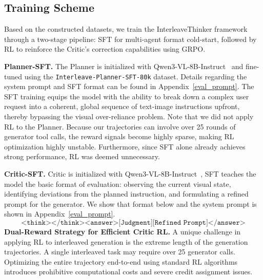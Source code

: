 \documentclass{article} %
\begin{document}
\subsection{Training Scheme}
\label{subsec:training}

Based on the constructed datasets, we train the InterleaveThinker framework through a two-stage pipeline: SFT for multi-agent format cold-start, followed by RL to reinforce the Critic's correction capabilities using GRPO.

\textbf{Planner-SFT.} The Planner is initialized with Qwen3-VL-8B-Instruct~\cite{qwen3vl} and fine-tuned using the \texttt{Interleave-Planner-SFT-80k} dataset. Details regarding the system prompt and SFT format can be found in Appendix~\ref{eval_prompt}. The SFT training equips the model with the ability to break down a complex user request into a coherent, global sequence of text-image instructions upfront, thereby bypassing the visual over-reliance problem. Note that we did not apply RL to the Planner. Because our trajectories can involve over 25 rounds of generator tool calls, the reward signals become highly sparse, making RL optimization highly unstable. Furthermore, since SFT alone already achieves strong performance, RL was deemed unnecessary.

\textbf{Critic-SFT.} Critic is initialized with Qwen3-VL-8B-Instruct~\cite{qwen3vl}, SFT teaches the model the basic format of evaluation: observing the current visual state, identifying deviations from the planned instruction, and formulating a refined prompt for the generator. We show that format below and the system prompt is shown in Appendix~\ref{eval_prompt}.
$$
\texttt{<think></think><answer>[Judgment][Refined Prompt]</answer>}
$$
\textbf{Dual-Reward Strategy for Efficient Critic RL.} 
A unique challenge in applying RL to interleaved generation is the extreme length of the generation trajectories. A single interleaved task may require over 25 generator calls. Optimizing the entire trajectory end-to-end using standard RL algorithms introduces prohibitive computational costs and severe credit assignment issues. 
\end{document}
